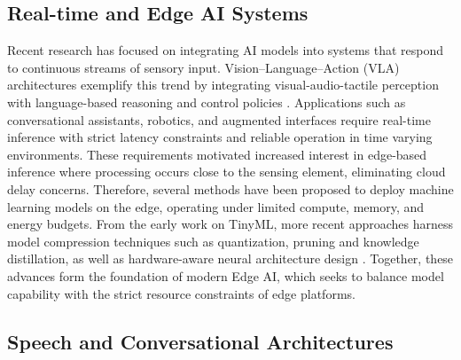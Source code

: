 \documentclass[manuscript,]{acmart} %
\begin{document}
\subsection{Real-time and Edge AI Systems}
Recent research has focused on integrating AI models into systems that respond to continuous streams of sensory input. Vision–Language–Action (VLA) architectures exemplify this trend by integrating visual-audio-tactile perception with language-based reasoning and control policies \cite{huang2026tactilevla} \cite{huang2026tafvlatactileforcealignmentvisionlanguageaction} \cite{bi2025vlatouchenhancingvisionlanguageactionmodels}. Applications such as conversational assistants, robotics, and augmented interfaces require real-time inference with strict latency constraints and reliable operation in time varying environments.
These requirements motivated increased interest in edge-based inference where processing occurs close to the sensing element, eliminating cloud delay concerns.
Therefore, several methods have been proposed to deploy machine learning models on the edge, operating under limited compute, memory, and energy budgets. From the early work on TinyML, more recent approaches harness model compression techniques such as quantization, pruning and knowledge distillation, as well as hardware-aware neural architecture design \cite{dnn_compression}.
Together, these advances form the foundation of modern Edge AI, which seeks to balance model capability with the strict resource constraints of edge platforms.
\subsection{Speech and Conversational Architectures}
\end{document}
